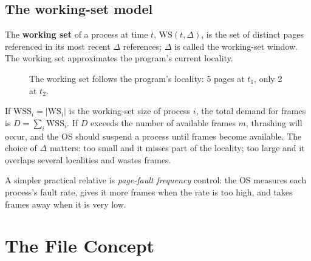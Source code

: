 \documentclass[11pt,a4paper]{article}
\newcommand{\term}[1]{\textbf{\color{mintdeep}#1}}
\begin{document}
\subsection{The working-set model}

The \term{working set} of a process at time $t$, $\text{WS}(t,\Delta)$, is the set of distinct pages referenced in its most recent $\Delta$ references; $\Delta$ is called the working-set window. The working set approximates the program's current locality.

\begin{figure}[H]
\centering
{}
\caption{The working set follows the program's locality: 5 pages at $t_1$, only 2 at $t_2$.}
\end{figure}

If $\text{WSS}_i = |\text{WS}_i|$ is the working-set size of process $i$, the total demand for frames is $D = \sum_i \text{WSS}_i$. If $D$ exceeds the number of available frames $m$, thrashing will occur, and the OS should suspend a process until frames become available. The choice of $\Delta$ matters: too small and it misses part of the locality; too large and it overlaps several localities and wastes frames.

A simpler practical relative is \emph{page-fault frequency} control: the OS measures each process's fault rate, gives it more frames when the rate is too high, and takes frames away when it is very low.

\section{The File Concept}
\end{document}
